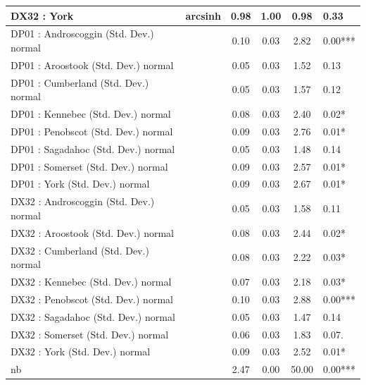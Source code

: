 \begin{table}
\begin{center}
\begin{tabular}{|l|l|c|c|c|l|}
			\hline
			DX32 : York & arcsinh & 0.98 & 1.00 & 0.98 & 0.33 \\
			\hline
			DP01 : Androscoggin (Std. Dev.) normal &  & 0.10 & 0.03 & 2.82 & 0.00*** \\
			\hline
			DP01 : Aroostook (Std. Dev.) normal &  & 0.05 & 0.03 & 1.52 & 0.13 \\
			\hline
			DP01 : Cumberland (Std. Dev.) normal &  & 0.05 & 0.03 & 1.57 & 0.12 \\
			\hline
			DP01 : Kennebec (Std. Dev.) normal &  & 0.08 & 0.03 & 2.40 & 0.02* \\
			\hline
			DP01 : Penobscot (Std. Dev.) normal &  & 0.09 & 0.03 & 2.76 & 0.01* \\
			\hline
			DP01 : Sagadahoc (Std. Dev.) normal &  & 0.05 & 0.03 & 1.48 & 0.14 \\
			\hline
			DP01 : Somerset (Std. Dev.) normal &  & 0.09 & 0.03 & 2.57 & 0.01* \\
			\hline
			DP01 : York (Std. Dev.) normal &  & 0.09 & 0.03 & 2.67 & 0.01* \\
			\hline
			DX32 : Androscoggin (Std. Dev.) normal &  & 0.05 & 0.03 & 1.58 & 0.11 \\
			\hline
			DX32 : Aroostook (Std. Dev.) normal &  & 0.08 & 0.03 & 2.44 & 0.02* \\
			\hline
			DX32 : Cumberland (Std. Dev.) normal &  & 0.08 & 0.03 & 2.22 & 0.03* \\
			\hline
			DX32 : Kennebec (Std. Dev.) normal &  & 0.07 & 0.03 & 2.18 & 0.03* \\
			\hline
			DX32 : Penobscot (Std. Dev.) normal &  & 0.10 & 0.03 & 2.88 & 0.00*** \\
			\hline
			DX32 : Sagadahoc (Std. Dev.) normal &  & 0.05 & 0.03 & 1.47 & 0.14 \\
			\hline
			DX32 : Somerset (Std. Dev.) normal &  & 0.06 & 0.03 & 1.83 & 0.07. \\
			\hline
			DX32 : York (Std. Dev.) normal &  & 0.09 & 0.03 & 2.52 & 0.01* \\
			\hline
			nb &  & 2.47 & 0.00 & 50.00 & 0.00*** \\
			\hline
		\end{tabular}
	\end{center}
\end{table}